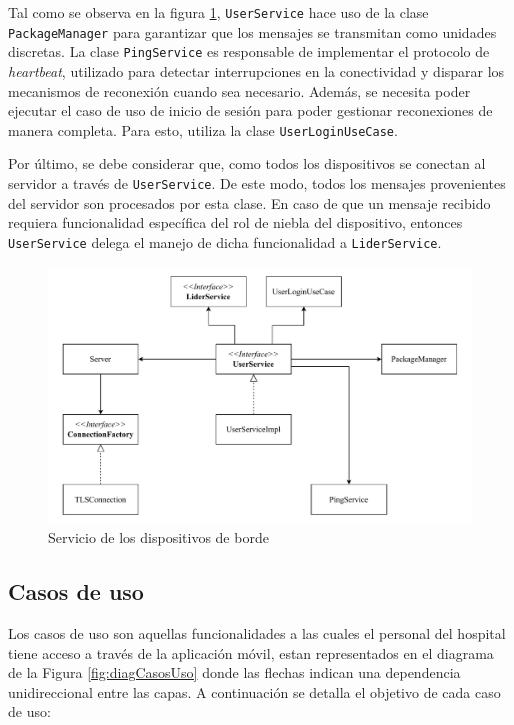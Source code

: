 Tal como se observa en la figura \ref{fig:clientService}, \texttt{UserService} hace uso de la clase \texttt{PackageManager} para garantizar que los mensajes se transmitan como unidades discretas. La clase \texttt{PingService} es responsable de implementar el protocolo de \textit{heartbeat}, utilizado para detectar interrupciones en la conectividad y disparar los mecanismos de reconexión cuando sea necesario. Además, se necesita poder ejecutar el caso de uso de inicio de sesión para poder gestionar reconexiones de manera completa. Para esto, utiliza la clase \texttt{UserLoginUseCase}.


Por último, se debe considerar que, como todos los dispositivos se conectan al servidor a través de \texttt{UserService}. De este modo, todos los mensajes provenientes del servidor son procesados por esta clase. En caso de que un mensaje recibido requiera funcionalidad específica del rol de niebla del dispositivo, entonces \texttt{UserService} delega el manejo de dicha funcionalidad a \texttt{LiderService}.


\begin{figure}
    \centering
    \includegraphics[width=\linewidth]{Imagenes/Implementacion/UserService.pdf}
    \caption{Servicio de los dispositivos de borde}
    \label{fig:clientService}
\end{figure}

\subsection{Casos de uso}
Los casos de uso son aquellas funcionalidades a las cuales el personal del hospital tiene acceso a través de la aplicación móvil, estan representados en el diagrama de la Figura \ref{fig:diagCasosUso} donde las flechas indican una dependencia unidireccional entre las capas. A continuación se detalla el objetivo de cada caso de uso:

